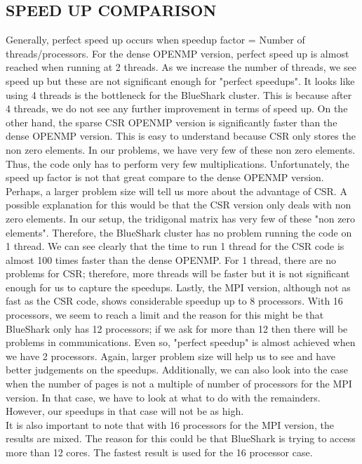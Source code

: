\documentclass[12pt]{article}
\begin{document}
   \subsection{SPEED UP COMPARISON}
   Generally, perfect speed up occurs when speedup factor = Number of threads/processors.  For the dense OPENMP version, perfect speed up is almost reached when running at 2 threads. As we increase the number of threads, we see speed up but these are not significant enough for "perfect speedups". It looks like using 4 threads is the bottleneck for the BlueShark cluster. This is because after 4 threads, we do not see any further improvement in terms of speed up. On the other hand, the sparse CSR OPENMP version is significantly faster than the dense OPENMP version.  This is easy to understand because CSR only stores the non zero elements. In our problems, we have very few of these non zero elements. Thus, the code only has to perform very few multiplications. Unfortunately, the speed up factor is not that great compare to the dense OPENMP version.  Perhaps, a larger problem size will tell us more about the advantage of CSR. A possible explanation for this would be that the CSR version only deals with non zero elements. In our setup, the tridigonal matrix has very few of these "non zero elements".  Therefore, the BlueShark cluster has no problem running the code on 1 thread. We can see clearly that the time to run 1 thread for the CSR code is almost 100 times faster than the dense OPENMP. For 1 thread, there are no problems for CSR; therefore, more threads will be faster but it is not significant enough for us to capture the speedups. Lastly, the MPI version, although not as fast as the CSR code, shows considerable speedup up to 8 processors. With 16 processors, we seem to reach a limit and the reason for this might be that BlueShark only has 12 processors; if we ask for more than 12 then there will be problems in communications. Even so, "perfect speedup" is almost achieved when we have 2 processors. Again, larger problem size will help us to see and have better judgements on the speedups. Additionally, we can also look into the case when the number of pages is not a multiple of number of processors for the MPI version. In that case, we have to look at what to do with the remainders. However, our speedups in that case will not be as high. \\
   It is also important to note that with 16 processors for the MPI version, the results are mixed. The reason for this could be that BlueShark is trying to access more than 12 cores. The fastest result is used for the 16 processor case.  
\end{document}
